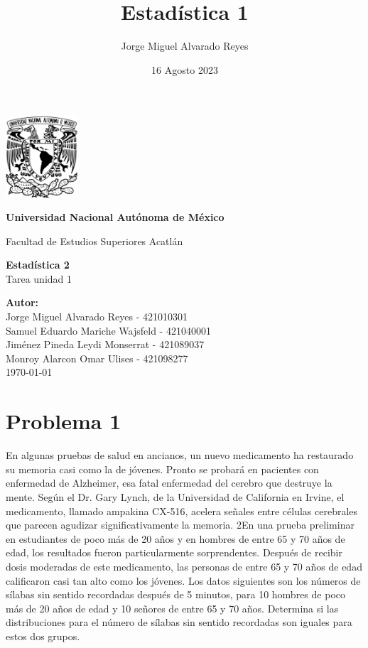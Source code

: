 \documentclass{article}
\title{Estadística 1}
\author{Jorge Miguel Alvarado Reyes}
\date{16 Agosto 2023}
\begin{document}
\begin{titlepage}
    \begin{center}
        \includegraphics[width=0.2\textwidth]{../../unam.png}
        \vspace*{.5cm}

        \LARGE
        \textbf{Universidad Nacional Autónoma de México}

        \vspace{0.5cm}
        \LARGE
        Facultad de Estudios Superiores Acatlán

        \vspace{2cm}

        \textbf{Estadística 2} \\
        Tarea unidad 1

        \vfill

        \vspace{1cm}

        \textbf{\large Autor:} \\
        Jorge Miguel Alvarado Reyes - 421010301 \\
        Samuel Eduardo Mariche Wajsfeld - 421040001 \\
        Jiménez Pineda Leydi Monserrat - 421089037 \\
        Monroy Alarcon Omar Ulises - 421098277\\
        \vspace{.5cm}
        \normalsize \today

    \end{center}
\end{titlepage}
\newpage

\tableofcontents

\newpage

\section{Problema 1}
En algunas pruebas de salud en ancianos, un nuevo medicamento ha restaurado su memoria casi como la de jóvenes. Pronto se probará en pacientes con enfermedad de Alzheimer, esa fatal enfermedad del cerebro que destruye la mente. Según el Dr. Gary Lynch, de la Universidad de California en Irvine, el medicamento, llamado ampakina CX-516, acelera señales entre células cerebrales que parecen agudizar significativamente la memoria. 2En una prueba preliminar en estudiantes de poco más de 20 años y en hombres de entre 65 y 70 años de edad, los resultados fueron particularmente sorprendentes. Después de recibir dosis moderadas de este medicamento, las personas de entre 65 y 70 años de edad calificaron casi tan alto como los jóvenes. Los datos siguientes son los números de sílabas sin sentido recordadas después de 5 minutos, para 10 hombres de poco más de 20 años de edad y 10 señores de entre 65 y 70 años. Determina si las distribuciones para el número de sílabas sin sentido recordadas son iguales para estos dos grupos.
\end{document}
